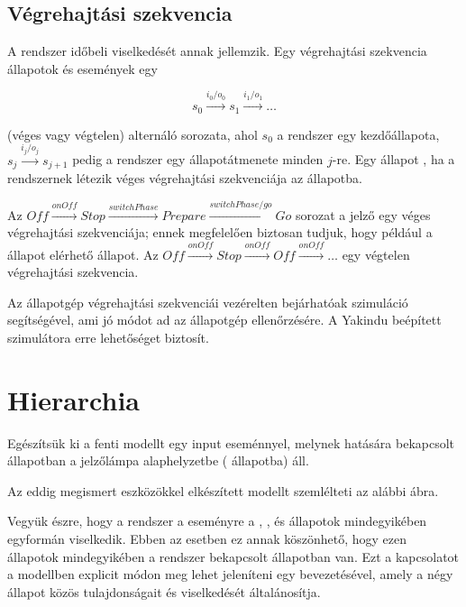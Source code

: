 \subsection{Végrehajtási szekvencia}

A rendszer időbeli viselkedését annak  jellemzik. Egy végrehajtási szekvencia állapotok és események egy

$$s_0 \xrightarrow{i_0 / o_0} s_1 \xrightarrow{i_1 / o_1} \ldots$$

(véges vagy végtelen) alternáló sorozata, ahol $s_0$ a rendszer egy kezdőállapota, $s_j \xrightarrow{i_j / o_j} s_{j+1}$ pedig a rendszer egy állapotátmenete minden $j$-re. Egy állapot , ha a rendszernek létezik véges végrehajtási szekvenciája az állapotba.

\begin{megjegyzes}
	Az $\mathit{Off} \xrightarrow{\mathit{onOff}} \mathit{Stop} \xrightarrow{\mathit{switchPhase}} \mathit{Prepare} \xrightarrow{\mathit{switchPhase} / \mathit{go}} \mathit{Go}$ sorozat a jelző egy véges végrehajtási szekvenciája; ennek megfelelően biztosan tudjuk, hogy például a  állapot elérhető állapot. Az $\mathit{Off} \xrightarrow{\mathit{onOff}} \mathit{Stop} \xrightarrow{\mathit{onOff}} \mathit{Off} \xrightarrow{\mathit{onOff}} \ldots$ egy végtelen végrehajtási szekvencia.
\end{megjegyzes}

Az állapotgép végrehajtási szekvenciái vezérelten bejárhatóak szimuláció segítségével, ami jó módot ad az állapotgép ellenőrzésére. A Yakindu beépített szimulátora erre lehetőséget biztosít.

\section{Hierarchia}

\begin{pelda}
	Egészítsük ki a fenti modellt egy  input eseménnyel, melynek hatására bekapcsolt állapotban a jelzőlámpa alaphelyzetbe ( állapotba) áll.

	Az eddig megismert eszközökkel elkészített modellt szemlélteti az alábbi ábra.

\end{pelda}

Vegyük észre, hogy a rendszer a  eseményre a , ,  és  állapotok mindegyikében egyformán viselkedik. Ebben az esetben ez annak köszönhető, hogy ezen állapotok mindegyikében a rendszer bekapcsolt állapotban van. Ezt a kapcsolatot a modellben explicit módon meg lehet jeleníteni egy  bevezetésével, amely a négy állapot közös tulajdonságait és viselkedését általánosítja.


